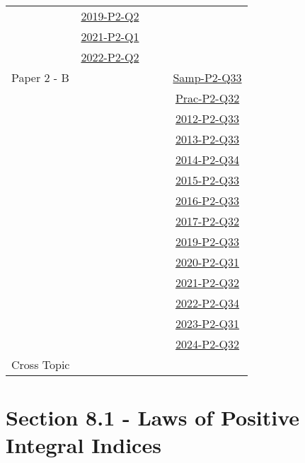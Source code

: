 \documentclass[12pt, a4paper]{article}
\begin{document}
\begin{absolutelynopagebreak}
\begin{center}
\begin{tabular}{|l|c|c|c|c|}
& \hyperref[DSE2019-CoreP2-Q02]{2019-P2-Q2} &  &  &  \\
& \hyperref[DSE2021-CoreP2-Q01]{2021-P2-Q1} &  &  &  \\
& \hyperref[DSE2022-CoreP2-Q02]{2022-P2-Q2} &  &  &  \\
\hline
Paper 2 - B&  &  &  & \hyperref[DSE2012S-CoreP2-Q33]{Samp-P2-Q33} \\
&  &  &  & \hyperref[DSE2012P-CoreP2-Q32]{Prac-P2-Q32} \\
&  &  &  & \hyperref[DSE2012-CoreP2-Q33]{2012-P2-Q33} \\
&  &  &  & \hyperref[DSE2013-CoreP2-Q33]{2013-P2-Q33} \\
&  &  &  & \hyperref[DSE2014-CoreP2-Q34]{2014-P2-Q34} \\
&  &  &  & \hyperref[DSE2015-CoreP2-Q33]{2015-P2-Q33} \\
&  &  &  & \hyperref[DSE2016-CoreP2-Q33]{2016-P2-Q33} \\
&  &  &  & \hyperref[DSE2017-CoreP2-Q32]{2017-P2-Q32} \\
&  &  &  & \hyperref[DSE2019-CoreP2-Q33]{2019-P2-Q33} \\
&  &  &  & \hyperref[DSE2020-CoreP2-Q31]{2020-P2-Q31} \\
&  &  &  & \hyperref[DSE2021-CoreP2-Q32]{2021-P2-Q32} \\
&  &  &  & \hyperref[DSE2022-CoreP2-Q34]{2022-P2-Q34} \\
&  &  &  & \hyperref[DSE2023-CoreP2-Q31]{2023-P2-Q31} \\
&  &  &  & \hyperref[DSE2024-CoreP2-Q32]{2024-P2-Q32} \\
\hline
\hline
Cross Topic&  &  &  &  \\
\hline
\end{tabular}
\end{center}
\end{absolutelynopagebreak}




\section*{Section 8.1 - Laws of Positive Integral Indices}\label{section:2-8-1}
\end{document}
